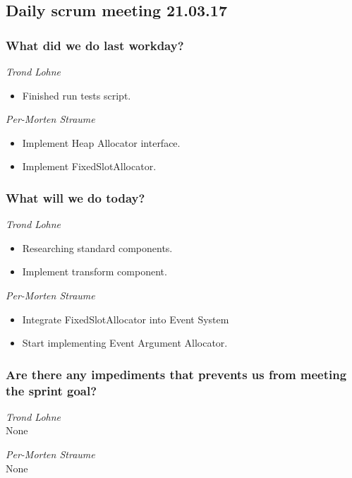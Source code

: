 \documentclass{article}
\begin{document}
\begin{center}
\subsection*{Daily scrum meeting 21.03.17}
\end{center}
\bigskip


\subsubsection*{What did we do last workday?}

\noindent\textit{Trond Lohne}
\begin{itemize}
	\item 
	Finished run tests script.
\end{itemize}

\medskip

\noindent\textit{Per-Morten Straume}
\begin{itemize}
	\item 
    Implement Heap Allocator interface.
    
    \item 
    Implement FixedSlotAllocator.
\end{itemize}


\subsubsection*{What will we do today?}

\noindent\textit{Trond Lohne}
\begin{itemize}
	\item 
	Researching standard components.
	
	\item 
	Implement transform component.
\end{itemize}

\medskip

\noindent\textit{Per-Morten Straume}
\begin{itemize}
	\item 
	Integrate FixedSlotAllocator into Event System
	
	\item 
	Start implementing Event Argument Allocator.
\end{itemize}


\subsubsection*{Are there any impediments that prevents us from meeting the sprint goal?}

\noindent\textit{Trond Lohne}\\
None

\medskip

\noindent\textit{Per-Morten Straume}\\
None
\end{document}
